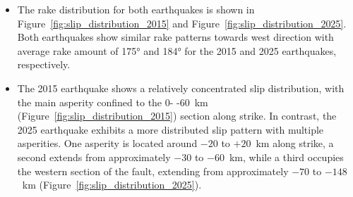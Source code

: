 \begin{itemize}[label=--,itemsep=2pt, topsep=0pt]
    \item The rake distribution for both earthquakes is shown in Figure~\ref{fig:slip_distribution_2015} and 
        Figure~\ref{fig:slip_distribution_2025}. Both earthquakes show similar rake patterns towards west direction with average 
        rake amount of 175° and 184° for the 2015 and 2025 earthquakes, respectively.

    \item The 2015 earthquake shows a relatively concentrated slip distribution, with the main asperity confined to the 0- -60~km (Figure~\ref{fig:slip_distribution_2015})
     section along strike. In contrast, the 2025 earthquake exhibits a more distributed slip pattern with multiple asperities. 
     One asperity is located around $-20$ to $+20$~km along strike, a second extends from approximately $-30$ to $-60$~km, while 
     a third occupies the western section of the fault, extending from approximately $-70$ to $-148$~km (Figure~\ref{fig:slip_distribution_2025}).


\end{itemize}
